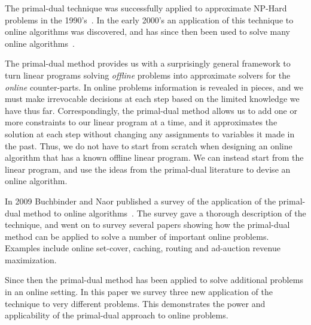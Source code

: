 The primal-dual technique was successfully applied to approximate NP-Hard problems in the 1990's~\cite{goemans92:approx}.
In the early 2000's an application of this technique to online algorithms was discovered, and has since then been used to solve many online algorithms~\cite{alon:2003:set-cover}.

The primal-dual method provides us with a surprisingly general framework to turn linear programs solving \emph{offline} problems into approximate solvers for the \emph{online} counter-parts.
In online problems information is revealed in pieces, and we must make irrevocable decisions at each step based on the limited knowledge we have thus far.
Correspondingly, the primal-dual method allows us to add one or more constraints to our linear program at a time, and it approximates the solution at each step without changing any assignments to variables it made in the past.
Thus, we do not have to start from scratch when designing an online algorithm that has a known offline linear program.
We can instead start from the linear program, and use the ideas from the primal-dual literature to devise an online algorithm.

In 2009 Buchbinder and Naor published a survey of the application of the primal-dual method to online algorithms~\cite{buchbinder09:survey}.
The survey gave a thorough description of the technique, and went on to survey several papers showing how the primal-dual method can be applied to solve a number of important online problems. 
Examples include online set-cover, caching, routing and ad-auction revenue maximization.

Since then the primal-dual method has been applied to solve additional problems in an online setting.
In this paper we survey three new application of the technique to very different problems.
This demonstrates the power and applicability of the primal-dual approach to online problems.


